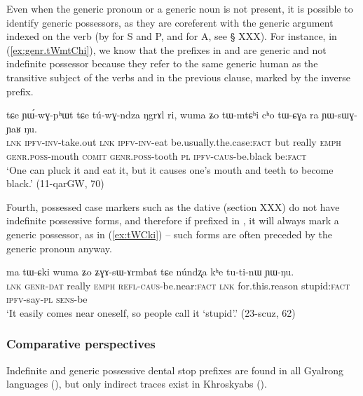 Even when the generic pronoun or a generic noun is not present, it is possible to identify generic possessors, as they are coreferent with the generic argument indexed on the verb (by  for S and P, and  for A, see § XXX). For instance, in (\ref{ex:genr.tWmtChi}), we know that  the  prefixes in  and   are generic and not indefinite possessor because they refer to the same generic human as the transitive subject of the verbs  and  in the previous clause, marked by the inverse prefix.

\begin{exe}
\ex  \label{ex:genr.tWmtChi}
\gll
tɕe ɲɯ́-wɣ-pʰɯt tɕe tú-wɣ-ndza ŋgrɤl ri, wuma ʑo tɯ-mtɕʰi cʰo tɯ-ɕɣa ra ɲɯ-sɯɣ-ɲaʁ ŋu. \\
\textsc{lnk} \textsc{ipfv}-\textsc{inv}-take.out \textsc{lnk} \textsc{ipfv}-\textsc{inv}-eat be.usually.the.case:\textsc{fact} but really \textsc{emph}  \textsc{genr.poss}-mouth \textsc{comit} \textsc{genr.poss}-tooth \textsc{pl}  \textsc{ipfv}-\textsc{caus}-be.black be:\textsc{fact} \\
\glt `One can pluck it and eat it, but it causes one's mouth and teeth to become black.' (11-qarGW, 70) 
\end{exe}

Fourth, possessed case markers such as the dative  (section XXX) do not have indefinite possessive forms, and therefore if prefixed in , it will always mark a generic possessor, as in (\ref{ex:tWCki}) -- such forms are often preceded by the generic pronoun  anyway.

\begin{exe}
\ex  \label{ex:tWCki}
\gll ma tɯ-ɕki wuma ʑo ʑɣɤ-sɯ-ɤrmbat tɕe núndʐa kʰe tu-ti-nɯ ɲɯ-ŋu. \\
\textsc{lnk} \textsc{genr-dat} really \textsc{emph} \textsc{refl}-\textsc{caus}-be.near:\textsc{fact} \textsc{lnk} for.this.reason stupid:\textsc{fact} \textsc{ipfv}-say-\textsc{pl} \textsc{sens}-be \\
\glt `It easily comes near oneself, so people call it `stupid'.' (23-scuz, 62) 
\end{exe}

\subsubsection{Comparative perspectives} \label{sec:indef.t.comparative}
Indefinite and generic possessive dental stop prefixes are found in all Gyalrong languages (\citealt{jackson98morphology}), but only indirect traces exist in Khroskyabs  (\citealt[155]{lai17khroskyabs}). 

